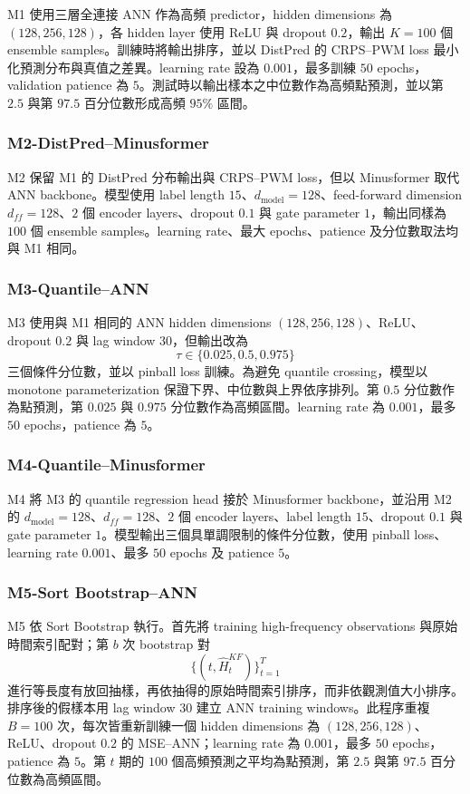 {M1 使用三層全連接 ANN 作為高頻 predictor，hidden dimensions 為 $(128,256,128)$，各 hidden layer 使用 ReLU 與 dropout $0.2$，輸出 $K=100$ 個 ensemble samples。訓練時將輸出排序，並以 DistPred 的 CRPS--PWM loss 最小化預測分布與真值之差異。learning rate 設為 $0.001$，最多訓練 $50$ epochs，validation patience 為 $5$。測試時以輸出樣本之中位數作為高頻點預測，並以第 $2.5$ 與第 $97.5$ 百分位數形成高頻 $95\%$ 區間。

\subsubsection*{M2-DistPred--Minusformer}

M2 保留 M1 的 DistPred 分布輸出與 CRPS--PWM loss，但以 Minusformer 取代 ANN backbone。模型使用 label length $15$、$d_{\mathrm{model}}=128$、feed-forward dimension $d_{ff}=128$、$2$ 個 encoder layers、dropout $0.1$ 與 gate parameter $1$，輸出同樣為 $100$ 個 ensemble samples。learning rate、最大 epochs、patience 及分位數取法均與 M1 相同。

\subsubsection*{M3-Quantile--ANN}

M3 使用與 M1 相同的 ANN hidden dimensions $(128,256,128)$、ReLU、dropout $0.2$ 與 lag window $30$，但輸出改為
\[
    \tau\in\{0.025,0.5,0.975\}
\]
三個條件分位數，並以 pinball loss 訓練。為避免 quantile crossing，模型以 monotone parameterization 保證下界、中位數與上界依序排列。第 $0.5$ 分位數作為點預測，第 $0.025$ 與 $0.975$ 分位數作為高頻區間。learning rate 為 $0.001$，最多 $50$ epochs，patience 為 $5$。

\subsubsection*{M4-Quantile--Minusformer}

M4 將 M3 的 quantile regression head 接於 Minusformer backbone，並沿用 M2 的 $d_{\mathrm{model}}=128$、$d_{ff}=128$、$2$ 個 encoder layers、label length $15$、dropout $0.1$ 與 gate parameter $1$。模型輸出三個具單調限制的條件分位數，使用 pinball loss、learning rate $0.001$、最多 $50$ epochs 及 patience $5$。

\subsubsection*{M5-Sort Bootstrap--ANN}

M5 依 Sort Bootstrap 執行。首先將 training high-frequency observations 與原始時間索引配對；第 $b$ 次 bootstrap 對
\[
    \{(t,\widehat H_t^{KF})\}_{t=1}^{T}
\]
進行等長度有放回抽樣，再依抽得的原始時間索引排序，而非依觀測值大小排序。排序後的假樣本用 lag window $30$ 建立 ANN training windows。此程序重複 $B=100$ 次，每次皆重新訓練一個 hidden dimensions 為 $(128,256,128)$、ReLU、dropout $0.2$ 的 MSE--ANN；learning rate 為 $0.001$，最多 $50$ epochs，patience 為 $5$。第 $t$ 期的 $100$ 個高頻預測之平均為點預測，第 $2.5$ 與第 $97.5$ 百分位數為高頻區間。

}
